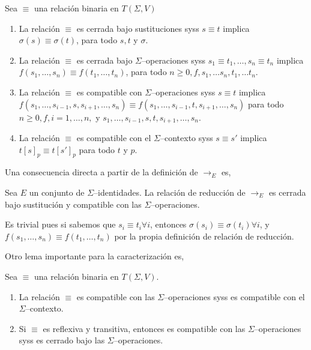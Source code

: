 \begin{defi} 
  Sea $\equiv$ una relación binaria en $T(\Sigma,V)$
  \begin{enumerate}
  \item La relación $\equiv$ es cerrada bajo sustituciones syss $s \equiv t$
    implica $\sigma(s) \equiv \sigma(t)$, para todo $s,t$ y $\sigma$. 
  \item La relación $\equiv$ es cerrada bajo $\Sigma$--operaciones syss $s_1
    \equiv t_1, \dots, s_n \equiv t_n$ implica $f(s_1, \dots, s_n) \equiv
    f(t_1, \dots, t_n)$, para todo $n \geq 0, f, s_1, \dots s_n, t_1, \dots
    t_n.$ 
  \item La relación $\equiv$ es compatible con $\Sigma$--operaciones syss $ s
    \equiv t$ implica $f(s_1, \dots, s_{i-1},s, s_{i+1},\dots, s_n) \equiv
    f(s_1, \dots, s_{i-1},t, s_{i+1},\dots, s_n)$ para todo $n \geq 0, f, i =
    1, \dots, n,$ y $s_1, \dots, s_{i-1},s,t, s_{i+1},\dots, s_n$. 
  \item La relación $\equiv$ es compatible con el $\Sigma$--contexto syss $s
    \equiv s'$ implica $t[s]_p \equiv t[s']_p$ para todo $t$ y $p$. 
  \end{enumerate}       
\end{defi}

Una consecuencia directa a partir de la definición de $\rightarrow_E$ es,

\begin{lema} \label{lema:2.1}
  Sea $E$ un conjunto de $\Sigma$--identidades. La relación de reducción de
  $\rightarrow_E$ es cerrada bajo sustitución y compatible con las
  $\Sigma$--operaciones.
\end{lema}

\begin{demo}
  Es trivial pues si sabemos que $s_i \equiv t_i \forall i$, entonces
  $\sigma(s_i) \equiv \sigma(t_i) \forall i$, y
  $f(s_1, \dots, s_n) \equiv f(t_1, \dots, t_n)$ por la propia
  definición de relación de reducción.
\end{demo}

Otro lema importante para la caracterización es,

\begin{lema} \label{lema:2.2}
  Sea $\equiv$ una relación binaria en $T(\Sigma,V)$.
  \begin{enumerate}
  \item La relación $\equiv$ es compatible con las
    $\Sigma$--operaciones syss es compatible con el
    $\Sigma$--contexto.
  \item Si $\equiv$ es reflexiva y transitiva, entonces es compatible
    con las $\Sigma$--operaciones syss es cerrado bajo las
    $\Sigma$--operaciones.
  \end{enumerate}
\end{lema}

